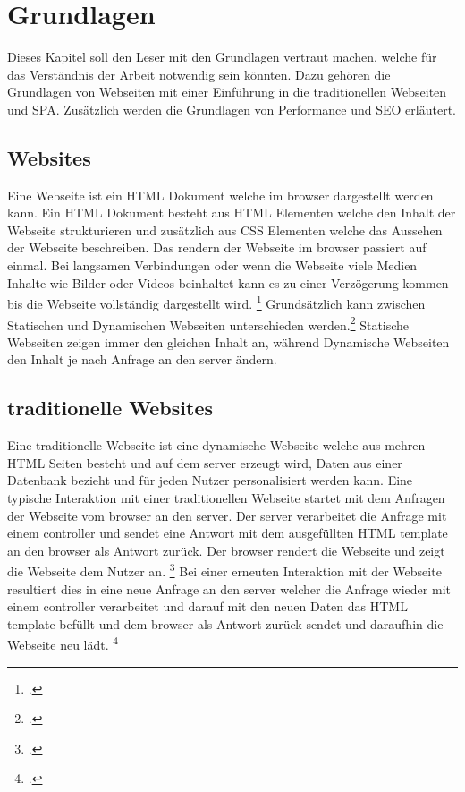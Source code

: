 \section{Grundlagen}
Dieses Kapitel soll den Leser mit den Grundlagen vertraut machen, welche für das Verständnis der Arbeit notwendig sein könnten.
Dazu gehören die Grundlagen von Webseiten mit einer Einführung in die traditionellen Webseiten und \ac{SPA}.
Zusätzlich werden die Grundlagen von Performance und \ac{SEO} erläutert.

\subsection{Websites}
Eine Webseite ist ein \ac{HTML} Dokument welche im \gls{browser} dargestellt werden kann.
Ein \ac{HTML} Dokument besteht aus \ac{HTML} Elementen welche den Inhalt der Webseite strukturieren und zusätzlich aus \ac{CSS} Elementen welche das Aussehen der Webseite beschreiben.
Das rendern der Webseite im \gls{browser} passiert auf einmal. Bei langsamen Verbindungen oder wenn die Webseite viele Medien Inhalte wie Bilder oder Videos beinhaltet kann es zu einer Verzögerung kommen bis die Webseite vollständig dargestellt wird. \footcite[Vgl.][Seite 27 - 31]{Robbins2018}
Grundsätzlich kann zwischen Statischen und Dynamischen Webseiten unterschieden werden.\footcite[Vgl.][Seite 25 - 27]{Robbins2018}
Statische Webseiten zeigen immer den gleichen Inhalt an, während Dynamische Webseiten den Inhalt je nach Anfrage an den \gls{server} ändern.

\subsection{traditionelle Websites}
Eine traditionelle Webseite ist eine dynamische Webseite welche aus mehren \ac{HTML} Seiten besteht und auf dem \gls{server} erzeugt wird,
Daten aus einer Datenbank bezieht und für jeden Nutzer personalisiert werden kann.
Eine typische Interaktion mit einer traditionellen Webseite startet mit dem Anfragen der Webseite vom \gls{browser} an den \gls{server}.
Der \gls{server} verarbeitet die Anfrage mit einem \gls{controller} und sendet eine Antwort mit dem ausgefüllten \ac{HTML} \gls{template} an den \gls{browser} als Antwort zurück.
Der \gls{browser} rendert die Webseite und zeigt die Webseite dem Nutzer an. \footcite[Vgl.][Seite 32]{Robbins2018}
Bei einer erneuten Interaktion mit der Webseite resultiert dies in eine neue Anfrage an den \gls{server} welcher die Anfrage wieder mit einem \gls{controller} verarbeitet und darauf mit
den neuen Daten das \ac{HTML} \gls{template} befüllt und dem \gls{browser} als Antwort zurück sendet und daraufhin die Webseite neu lädt. \footcite[Vgl.][Seite 5]{Scott2015}

